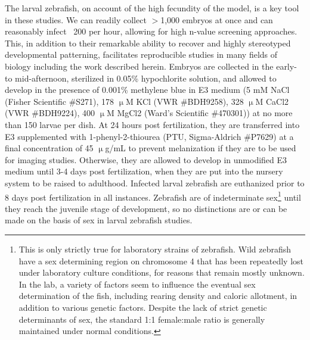 The larval zebrafish, on account of the high fecundity of the model, is a key tool in these studies. We can readily collect $>$1,000 embryos at once and can reasonably infect ~200 per hour, allowing for high n-value screening approaches. This, in addition to their remarkable ability to recover and highly stereotyped developmental patterning, facilitates reproducible studies in many fields of biology including the work described herein. Embryos are collected in the early- to mid-afternoon, sterilized in 0.05\% hypochlorite solution, and allowed to develop in the presence of 0.001\% methylene blue in E3 medium (5 mM NaCl (Fisher Scientific \#S271), 178 $\upmu$M KCl (VWR \#BDH9258), 328 $\upmu$M CaCl2 (VWR \#BDH9224), 400 $\upmu$M MgCl2 (Ward's Scientific \#470301)) at no more than 150 larvae per dish. At 24 hours post fertilization, they are transferred into E3 supplemented with 1-phenyl-2-thiourea (PTU, Sigma-Aldrich \#P7629) at a final concentration of 45 $\upmu$g/mL to prevent melanization if they are to be used for imaging studies. Otherwise, they are allowed to develop in unmodified E3 medium until 3-4 days post fertilization, when they are put into the nursery system to be raised to adulthood. Infected larval zebrafish are euthanized prior to 8 days post fertilization in all instances. Zebrafish are of indeterminate sex\footnote{This is only strictly true for laboratory strains of zebrafish. Wild zebrafish have a sex determining region on chromosome 4 that has been repeatedly lost under laboratory culture conditions, for reasons that remain mostly unknown. In the lab, a variety of factors seem to influence the eventual sex determination of the fish, including rearing density and caloric allotment, in addition to various genetic factors. Despite the lack of strict genetic determinants of sex, the standard 1:1 female:male ratio is generally maintained under normal conditions.} until they reach the juvenile stage of development, so no distinctions are or can be made on the basis of sex in larval zebrafish studies.

